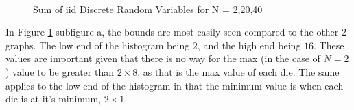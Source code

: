 \documentclass[a4paper, 11pt]{article}
\begin{document}
\pagebreak
\begin{figure}
    \centering
     \\
\caption{\label{fig:DiscreteSubfig}Sum of iid Discrete Random Variables for N = 2,20,40}
\end{figure}

\noindent
In Figure \ref{fig:DiscreteSubfig} subfigure a, the bounds are most easily seen compared to the other 2 graphs. The low end of the histogram being \(2\), and the high end being \(16\). These values are important given that there is no way for the max (in the case of \(N = 2\)) value to be greater than \(2 \times 8\), as that is the max value of each die. The same applies to the low end of the histogram in that the minimum value is when each die is at it's minimum, \(2 \times 1\).
\end{document}
